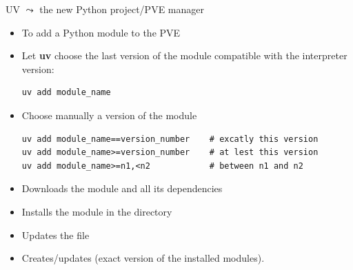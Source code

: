 \documentclass[11pt, serif, mathserif, compress]{beamer}  %
\newcommand{\boldtt}[1]{{\ttfamily\bfseries #1}}
\begin{document}
\begin{frame}[fragile]{UV $\leadsto$ the new Python project/PVE manager}

  \begin{tcolorbox}[title={\bf uv} command: \boldtt{add}, add to width=5mm]
    \begin{itemize}
    \item To add a Python module to the PVE
    \item Let \boldtt{uv} choose the last version of the module compatible with the interpreter version:
      \begin{verbatim}
uv add module_name
      \end{verbatim}
    \item Choose manually a version of the module
      \begin{verbatim}
uv add module_name==version_number    # excatly this version
uv add module_name>=version_number    # at lest this version
uv add module_name>=n1,<n2            # between n1 and n2
      \end{verbatim}
    \end{itemize}
  \end{tcolorbox}

      {\small 
        \begin{itemize}\setlength\itemsep{0mm}
        \item Downloads the module and all its dependencies
        \item Installs the module in the  directory
        \item Updates the file 
        \item Creates/updates  (exact version of the installed modules).
        \end{itemize}
      }
\end{frame}
\end{document}
